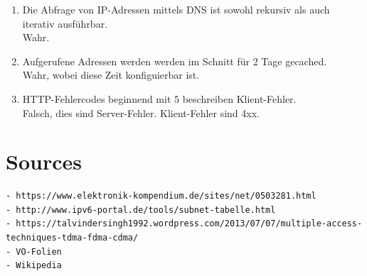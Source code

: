 \documentclass{article}
\begin{document}
\begin{enumerate}
        \item Die Abfrage von IP-Adressen mittels DNS ist sowohl rekursiv als auch iterativ ausführbar.\\
        Wahr. 
        
        \item Aufgerufene Adressen werden werden im Schnitt für 2 Tage gecached.\\
        Wahr, wobei diese Zeit konfiguierbar ist.
        
        \item HTTP-Fehlercodes beginnend mit 5 beschreiben Klient-Fehler.\\
        Falsch, dies sind Server-Fehler. Klient-Fehler sind 4xx.
        \end{enumerate}
        
\section{Sources}
    \begin{verbatim}
- https://www.elektronik-kompendium.de/sites/net/0503281.html
- http://www.ipv6-portal.de/tools/subnet-tabelle.html
- https://talvindersingh1992.wordpress.com/2013/07/07/multiple-access-techniques-tdma-fdma-cdma/
- VO-Folien
- Wikipedia
    \end{verbatim}
\end{document}
